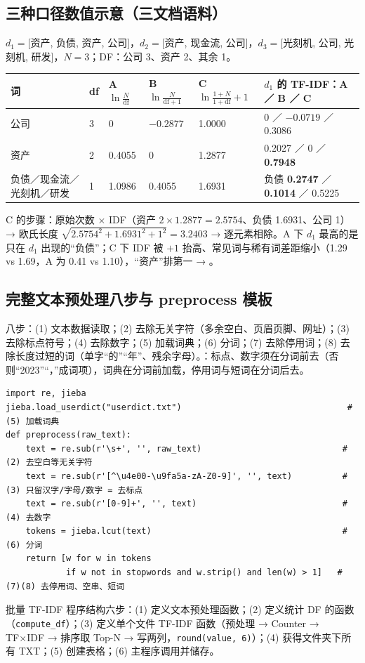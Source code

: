 \subsection{三种口径数值示意（三文档语料）}
$d_1=$[资产, 负债, 资产, 公司]，$d_2=$[资产, 现金流, 公司]，$d_3=$[光刻机, 公司, 光刻机, 研发]，$N=3$；DF：公司 3、资产 2、其余 1。
\begin{tabD08a}
\begin{tabularx}{\linewidth}{@{}p{3cm}p{0.6cm}p{2cm}p{2.2cm}p{2.4cm}L@{}}
\toprule
词 & df & A $\ln\frac N{\mathrm{df}}$ & B $\ln\frac N{\mathrm{df}+1}$ & C $\ln\frac{1+N}{1+\mathrm{df}}+1$ & $d_1$ 的 TF-IDF：A ／ B ／ C \\
\midrule
公司 & 3 & 0 & $-0.2877$ & 1.0000 & 0 ／ $-0.0719$ ／ 0.3086 \\
资产 & 2 & 0.4055 & 0 & 1.2877 & 0.2027 ／ 0 ／ \textbf{0.7948} \\
负债／现金流／光刻机／研发 & 1 & 1.0986 & 0.4055 & 1.6931 & 负债 \textbf{0.2747} ／ \textbf{0.1014} ／ 0.5225 \\
\bottomrule
\end{tabularx}
\end{tabD08a}
C 的步骤：原始次数 × IDF（资产 $2\times1.2877=2.5754$、负债 1.6931、公司 1）→ 欧氏长度 $\sqrt{2.5754^2+1.6931^2+1^2}=3.2403$ → 逐元素相除。A 下 $d_1$ 最高的是只在 $d_1$ 出现的“负债”；C 下 IDF 被 $+1$ 抬高、常见词与稀有词差距缩小（1.29 vs 1.69，A 为 0.41 vs 1.10），“资产”排第一 → 。

\subsection{完整文本预处理八步与 preprocess 模板}
八步：(1) 文本数据读取；(2) 去除无关字符（多余空白、页眉页脚、网址）；(3) 去除标点符号；(4) 去除数字；(5) 加载词典；(6) 分词；(7) 去除停用词；(8) 去除长度过短的词（单字“的”“年”、残余字母）。：标点、数字须在分词前去（否则“2023”“，”成词项），词典在分词前加载，停用词与短词在分词后去。
\begin{lstlisting}[style=pyD08a]
import re, jieba
jieba.load_userdict("userdict.txt")                                 # (5) 加载词典
def preprocess(raw_text):
    text = re.sub(r'\s+', '', raw_text)                            # (2) 去空白等无关字符
    text = re.sub(r'[^\u4e00-\u9fa5a-zA-Z0-9]', '', text)          # (3) 只留汉字/字母/数字 = 去标点
    text = re.sub(r'[0-9]+', '', text)                             # (4) 去数字
    tokens = jieba.lcut(text)                                      # (6) 分词
    return [w for w in tokens
            if w not in stopwords and w.strip() and len(w) > 1]   # (7)(8) 去停用词、空串、短词
\end{lstlisting}
批量 TF-IDF 程序结构六步：(1) 定义文本预处理函数；(2) 定义统计 DF 的函数（\texttt{compute\_df}）；(3) 定义单个文件 TF-IDF 函数（预处理 → Counter → TF×IDF → 排序取 Top-N → 写两列，\texttt{round(value, 6)}）；(4) 获得文件夹下所有 TXT；(5) 创建表格；(6) 主程序调用并储存。

